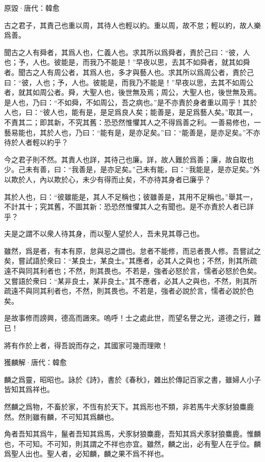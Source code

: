 \documentclass[12pt,a4paper]{ctexbook}
\begin{document}
原毀·唐代：韓愈 \par
古之君子，其責己也重以周，其待人也輕以約。重以周，故不怠；輕以約，故人樂爲善。\par
聞古之人有舜者，其爲人也，仁義人也。求其所以爲舜者，責於己曰：“彼，人也；予，人也。彼能是，而我乃不能是！”早夜以思，去其不如舜者，就其如舜者。聞古之人有周公者，其爲人也，多才與藝人也。求其所以爲周公者，責於己曰：“彼，人也；予，人也。彼能是，而我乃不能是！”早夜以思，去其不如周公者，就其如周公者。舜，大聖人也，後世無及焉；周公，大聖人也，後世無及焉。是人也，乃曰：“不如舜，不如周公，吾之病也。”是不亦責於身者重以周乎！其於人也，曰：“彼人也，能有是，是足爲良人矣；能善是，是足爲藝人矣。”取其一，不責其二；即其新，不究其舊：恐恐然惟懼其人之不得爲善之利。一善易修也，一藝易能也，其於人也，乃曰：“能有是，是亦足矣。”曰：“能善是，是亦足矣。”不亦待於人者輕以約乎？\par
今之君子則不然。其責人也詳，其待己也廉。詳，故人難於爲善；廉，故自取也少。己未有善，曰：“我善是，是亦足矣。”己未有能，曰：“我能是，是亦足矣。”外以欺於人，內以欺於心，未少有得而止矣，不亦待其身者已廉乎？\par
其於人也，曰：“彼雖能是，其人不足稱也；彼雖善是，其用不足稱也。”舉其一，不計其十；究其舊，不圖其新：恐恐然惟懼其人之有聞也。是不亦責於人者已詳乎？\par
夫是之謂不以衆人待其身，而以聖人望於人，吾未見其尊己也。\par
雖然，爲是者，有本有原，怠與忌之謂也。怠者不能修，而忌者畏人修。吾嘗試之矣，嘗試語於衆曰：“某良士，某良士。”其應者，必其人之與也；不然，則其所疏遠不與同其利者也；不然，則其畏也。不若是，強者必怒於言，懦者必怒於色矣。又嘗語於衆曰：“某非良士，某非良士。”其不應者，必其人之與也，不然，則其所疏遠不與同其利者也，不然，則其畏也。不若是，強者必說於言，懦者必說於色矣。\par
是故事修而謗興，德高而譭來。嗚呼！士之處此世，而望名譽之光，道德之行，難已！\par
將有作於上者，得吾說而存之，其國家可幾而理歟！\par
獲麟解·唐代：韓愈 \par
麟之爲靈，昭昭也。詠於《詩》，書於《春秋》，雜出於傳記百家之書，雖婦人小子皆知其爲祥也。\par
然麟之爲物，不畜於家，不恆有於天下。其爲形也不類，非若馬牛犬豕豺狼麋鹿然。然則雖有麟，不可知其爲麟也。\par
角者吾知其爲牛，鬣者吾知其爲馬，犬豕豺狼麋鹿，吾知其爲犬豕豺狼麋鹿。惟麟也，不可知。不可知，則其謂之不祥也亦宜。雖然，麟之出，必有聖人在乎位。麟爲聖人出也。聖人者，必知麟，麟之果不爲不祥也。\par
\end{document}
